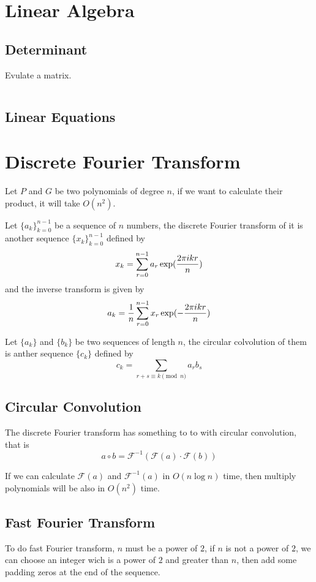 \section{Linear Algebra}
\subsection{Determinant}
Evulate a matrix.

$$
$$
\subsection{Linear Equations}


\section{Discrete Fourier Transform}

Let $P$ and $G$ be two polynomials of degree $n$, if we want to calculate their product, 
it will take $O(n^2)$.

Let $\{a_k\}_{k=0}^{n-1}$ be a sequence of $n$ numbers,
the discrete Fourier transform of it is another sequence $\{x_k\}_{k=0}^{n-1}$ defined by 
$$x_k = \sum_{r=0}^{n-1} a_r \exp({2\pi i kr \over n})$$
and the inverse transform is given by 
$$a_k = {1 \over n} \sum_{r=0}^{n-1} x_r \exp(-{2\pi i kr \over n})$$

Let $\{a_k\}$ and $\{b_k\}$ be two sequences of length $n$, 
the circular colvolution of them is anther sequence $\{c_k\}$ defined by
$$c_k = \sum_{r+s \equiv k \pmod n} a_r b_s$$

\subsection{Circular Convolution}

The discrete Fourier transform has something to to with circular convolution, 
that is $$a \circ b = \mathcal{F}^{-1}(\mathcal{F}(a) \cdot \mathcal{F}(b))$$

If we can calculate $\mathcal{F}(a)$ and $\mathcal{F}^{-1}(a)$ in $O(n \log n)$ time,
then multiply polynomials will be also in $O(n^2)$ time.

\subsection{Fast Fourier Transform}
To do fast Fourier transform, $n$ must be a power of $2$, 
if $n$ is not a power of $2$, we can choose an integer wich is a power of $2$
and greater than $n$, then add some padding zeros at the end of the sequence.

